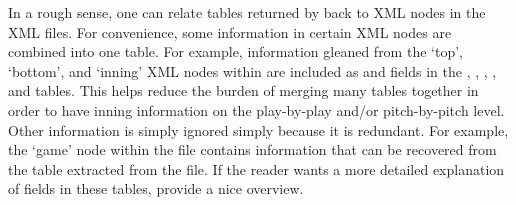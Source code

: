 \begin{article}
In a rough sense, one can relate tables returned by  back
to XML nodes in the XML files. For convenience, some information in
certain XML nodes are combined into one table. For example,
information gleaned from the `top', `bottom', and `inning' XML nodes
within  are included as  and
 fields in the , ,
, , and  tables. This helps
reduce the burden of merging many tables together in order to have
inning information on the play-by-play and/or pitch-by-pitch
level. Other information is simply ignored simply because it is
redundant. For example, the `game' node within the 
file contains information that can be recovered from the 
table extracted from the  file. If the reader
wants a more detailed explanation of fields in these tables,
\citet{baseball} provide a nice overview.


\end{article}
